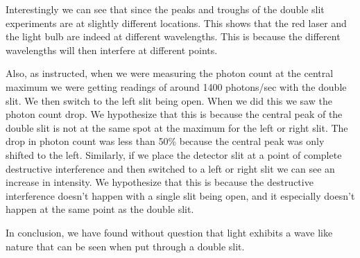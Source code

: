 \documentclass[12pt letterpaper]{article}
\begin{document}
Interestingly we can see that since the peaks and troughs of the double slit experiments are at slightly different locations. This shows that the red laser and the light bulb are indeed at different wavelengths. This is because the different wavelengths will then interfere at different points.  

Also, as instructed, when we were measuring the photon count at the central maximum we were getting readings of around 1400 photons/sec with the double slit. We then switch to the left slit being open. When we did this we saw the photon count drop. We hypothesize that this is because the central peak of the double slit is not at the same spot at the maximum for the left or right slit. The drop in photon count was less than 50\% because the central peak was only shifted to the left. Similarly, if we place the detector slit at a point of complete destructive interference and then switched to a left or right slit we can see an increase in intensity. We hypothesize that this is because the destructive interference doesn't happen with a single slit being open, and it especially doesn't happen at the same point as the double slit. 

In conclusion, we have found without question that light exhibits a wave like nature that can be seen when put through a double slit. 
\end{document}
